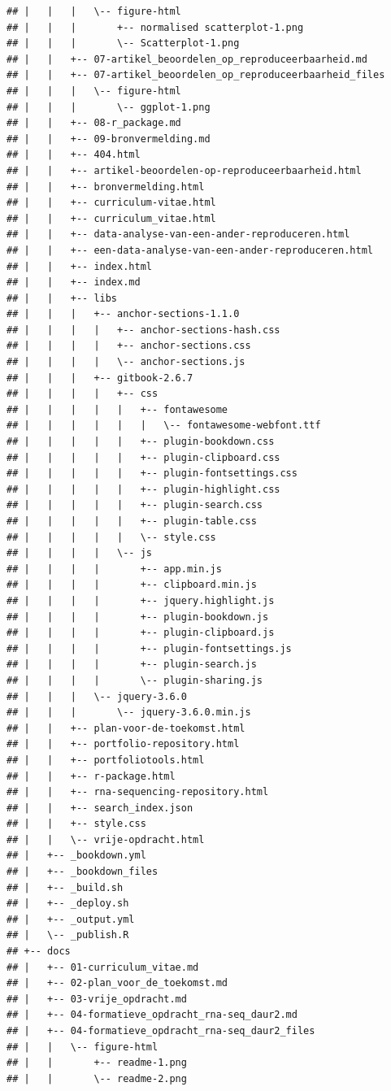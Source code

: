 \documentclass[
]{book}
\begin{document}
\begin{verbatim}
## |   |   |   \-- figure-html
## |   |   |       +-- normalised scatterplot-1.png
## |   |   |       \-- Scatterplot-1.png
## |   |   +-- 07-artikel_beoordelen_op_reproduceerbaarheid.md
## |   |   +-- 07-artikel_beoordelen_op_reproduceerbaarheid_files
## |   |   |   \-- figure-html
## |   |   |       \-- ggplot-1.png
## |   |   +-- 08-r_package.md
## |   |   +-- 09-bronvermelding.md
## |   |   +-- 404.html
## |   |   +-- artikel-beoordelen-op-reproduceerbaarheid.html
## |   |   +-- bronvermelding.html
## |   |   +-- curriculum-vitae.html
## |   |   +-- curriculum_vitae.html
## |   |   +-- data-analyse-van-een-ander-reproduceren.html
## |   |   +-- een-data-analyse-van-een-ander-reproduceren.html
## |   |   +-- index.html
## |   |   +-- index.md
## |   |   +-- libs
## |   |   |   +-- anchor-sections-1.1.0
## |   |   |   |   +-- anchor-sections-hash.css
## |   |   |   |   +-- anchor-sections.css
## |   |   |   |   \-- anchor-sections.js
## |   |   |   +-- gitbook-2.6.7
## |   |   |   |   +-- css
## |   |   |   |   |   +-- fontawesome
## |   |   |   |   |   |   \-- fontawesome-webfont.ttf
## |   |   |   |   |   +-- plugin-bookdown.css
## |   |   |   |   |   +-- plugin-clipboard.css
## |   |   |   |   |   +-- plugin-fontsettings.css
## |   |   |   |   |   +-- plugin-highlight.css
## |   |   |   |   |   +-- plugin-search.css
## |   |   |   |   |   +-- plugin-table.css
## |   |   |   |   |   \-- style.css
## |   |   |   |   \-- js
## |   |   |   |       +-- app.min.js
## |   |   |   |       +-- clipboard.min.js
## |   |   |   |       +-- jquery.highlight.js
## |   |   |   |       +-- plugin-bookdown.js
## |   |   |   |       +-- plugin-clipboard.js
## |   |   |   |       +-- plugin-fontsettings.js
## |   |   |   |       +-- plugin-search.js
## |   |   |   |       \-- plugin-sharing.js
## |   |   |   \-- jquery-3.6.0
## |   |   |       \-- jquery-3.6.0.min.js
## |   |   +-- plan-voor-de-toekomst.html
## |   |   +-- portfolio-repository.html
## |   |   +-- portfoliotools.html
## |   |   +-- r-package.html
## |   |   +-- rna-sequencing-repository.html
## |   |   +-- search_index.json
## |   |   +-- style.css
## |   |   \-- vrije-opdracht.html
## |   +-- _bookdown.yml
## |   +-- _bookdown_files
## |   +-- _build.sh
## |   +-- _deploy.sh
## |   +-- _output.yml
## |   \-- _publish.R
## +-- docs
## |   +-- 01-curriculum_vitae.md
## |   +-- 02-plan_voor_de_toekomst.md
## |   +-- 03-vrije_opdracht.md
## |   +-- 04-formatieve_opdracht_rna-seq_daur2.md
## |   +-- 04-formatieve_opdracht_rna-seq_daur2_files
## |   |   \-- figure-html
## |   |       +-- readme-1.png
## |   |       \-- readme-2.png

\end{verbatim}
\end{document}
